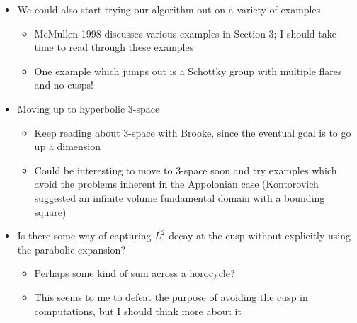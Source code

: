 \documentclass[]{article}
\begin{document}
\begin{itemize}
\begin{itemize}
	\end{itemize}
	\item We could also start trying our algorithm out on a variety of examples
	\begin{itemize}
		\item McMullen 1998 discusses various examples in Section 3; I should take time to read through these examples
		\item One example which jumps out is a Schottky group with multiple flares and no cusps!
	\end{itemize}
	\item Moving up to hyperbolic 3-space
	\begin{itemize}
		\item Keep reading about 3-space with Brooke, since the eventual goal is to go up a dimension
		\item Could be interesting to move to 3-space soon and try examples which avoid the problems inherent in the Appolonian case (Kontorovich suggested an infinite volume fundamental domain with a bounding square)
	\end{itemize}
	\item Is there some way of capturing $L^2$ decay at the cusp without explicitly using the parabolic expansion?
	\begin{itemize}
		\item Perhaps some kind of sum across a horocycle?
		\item This seems to me to defeat the purpose of avoiding the cusp in computations, but I should think more about it
	\end{itemize}
\end{itemize}
\end{document}
